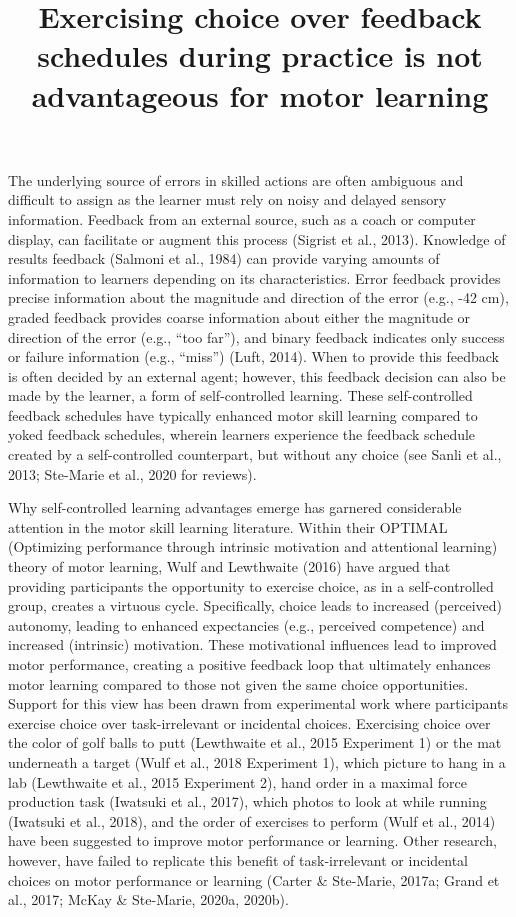 \documentclass[
  doc, donotrepeattitle,floatsintext]{apa7}
\title{Exercising choice over feedback schedules during practice is not advantageous for motor learning}
\author{\phantom{0}}
\date{}
\affiliation{\phantom{0}}
\begin{document}
\maketitle

The underlying source of errors in skilled actions are often ambiguous and difficult to assign as the learner must rely on noisy and delayed sensory information. Feedback from an external source, such as a coach or computer display, can facilitate or augment this process (Sigrist et al., 2013). Knowledge of results feedback (Salmoni et al., 1984) can provide varying amounts of information to learners depending on its characteristics. Error feedback provides precise information about the magnitude and direction of the error (e.g., -42 cm), graded feedback provides coarse information about either the magnitude or direction of the error (e.g., ``too far''), and binary feedback indicates only success or failure information (e.g., ``miss'') (Luft, 2014). When to provide this feedback is often decided by an external agent; however, this feedback decision can also be made by the learner, a form of self-controlled learning. These self-controlled feedback schedules have typically enhanced motor skill learning compared to yoked feedback schedules, wherein learners experience the feedback schedule created by a self-controlled counterpart, but without any choice (see Sanli et al., 2013; Ste-Marie et al., 2020 for reviews).

Why self-controlled learning advantages emerge has garnered considerable attention in the motor skill learning literature. Within their OPTIMAL (Optimizing performance through intrinsic motivation and attentional learning) theory of motor learning, Wulf and Lewthwaite (2016) have argued that providing participants the opportunity to exercise choice, as in a self-controlled group, creates a virtuous cycle. Specifically, choice leads to increased (perceived) autonomy, leading to enhanced expectancies (e.g., perceived competence) and increased (intrinsic) motivation. These motivational influences lead to improved motor performance, creating a positive feedback loop that ultimately enhances motor learning compared to those not given the same choice opportunities. Support for this view has been drawn from experimental work where participants exercise choice over task-irrelevant or incidental choices. Exercising choice over the color of golf balls to putt (Lewthwaite et al., 2015 Experiment 1) or the mat underneath a target (Wulf et al., 2018 Experiment 1), which picture to hang in a lab (Lewthwaite et al., 2015 Experiment 2), hand order in a maximal force production task (Iwatsuki et al., 2017), which photos to look at while running (Iwatsuki et al., 2018), and the order of exercises to perform (Wulf et al., 2014) have been suggested to improve motor performance or learning. Other research, however, have failed to replicate this benefit of task-irrelevant or incidental choices on motor performance or learning (Carter \& Ste-Marie, 2017a; Grand et al., 2017; McKay \& Ste-Marie, 2020a, 2020b).
\end{document}
